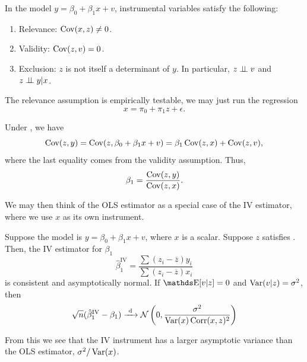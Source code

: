 \documentclass[letterpaper, 10pt]{article}
\DeclareMathOperator{\IV}{IV}
\begin{document}
\begin{assumption}\label{as:IV-simple}
  In the model \(y = \beta_0 + \beta_1 x + v\), instrumental variables satisfy the following:
  \begin{enumerate}[label=(\roman*)]
    \item Relevance: \(\operatorname{Cov}(x, z) \neq 0\).
    \item Validity: \(\operatorname{Cov}(z, v) = 0\).
    \item Exclusion: \(z\) is not itself a determinant of \(y\).
      In particular, \(z \perp \!\!\! \perp v\) and \(z \perp \!\!\! \perp y | x\).
  \end{enumerate}
\end{assumption}
\begin{remark}
  The relevance assumption is empirically testable, we may just run the regression
  \[
    x = \pi_0 + \pi_1 z + \epsilon.
  \]
\end{remark}

Under , we have
\[
  \operatorname{Cov}(z, y)
  = \operatorname{Cov}(z, \beta_0 + \beta_1 x + v)
  = \beta_1 \operatorname{Cov}(z, x) + \operatorname{Cov}(z, v),
\]
where the last equality comes from the validity assumption.
Thus,
\[
  \beta_1 = \frac{\operatorname{Cov}(z, y)}{\operatorname{Cov}(z, x)}.
\]

\begin{remark}
  We may then think of the OLS estimator as a special case of the IV estimator, where we use \(x\) as its own instrument.
\end{remark}


\begin{proposition}
  Suppose the model is \(y = \beta_0 + \beta_1 x + v\), where \(x\) is a scalar.
  Suppose \(z\) satisfies .
  Then, the IV estimator for \(\beta_1\)
  \[
    \hat{\beta}_1^{\mathrm{IV}}
    = \frac{\sum (z_i - \overline{z}) y_i}{\sum (z_i - \overline{z}) x_i}
  \]
  is consistent and asymptotically normal.
  If \(\E[v|z] = 0\) and  \(\operatorname{Var}(v|z) = \sigma^2\), then
   \[
     \sqrt{n} (\hat{\beta}^{\IV}_1 - \beta_1)
     \longdistto \Normal\left( 0, \frac{\sigma^2}{\Var(x) \Corr(x, z)^2} \right) 
  \]
\end{proposition}
\begin{remark}
  From this we see that the IV instrument has a larger asymptotic variance than the OLS estimator, \(\sigma^2 / \operatorname{Var}(x)\).
\end{remark}
\end{document}
